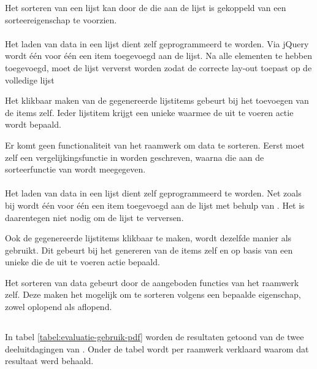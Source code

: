 Het sorteren van een lijst kan door de  die aan de lijst is gekoppeld van een sorteereigenschap te voorzien.

\paragraph{\jqm}
Het laden van data in een lijst dient zelf geprogrammeerd te worden.
Via jQuery wordt één voor één een item toegevoegd aan de lijst.
Na alle elementen te hebben toegevoegd, moet de lijst ververst worden zodat \jqm{} de correcte lay-out toepast op de volledige lijst

Het klikbaar maken van de gegenereerde lijstitems gebeurt bij het toevoegen van de items zelf.
Ieder lijstitem krijgt een unieke  waarmee de uit te voeren actie wordt bepaald.

Er komt geen functionaliteit van het raamwerk om data te sorteren.
Eerst moet zelf een vergelijkingsfunctie in \js{} worden geschreven, waarna die aan de sorteerfunctie van \js{} wordt meegegeven.

\paragraph{\lungo}
Het laden van data in een lijst dient zelf geprogrammeerd te worden.
Net zoals bij \jqm{} wordt één voor één een item toegevoegd aan de lijst met behulp van \quo{}.
Het is daarentegen niet nodig om de lijst te verversen.

Ook de gegenereerde lijstitems klikbaar te maken, wordt dezelfde manier  als \jqm{} gebruikt.
Dit gebeurt bij het genereren van de items zelf en op basis van een unieke  die de uit te voeren actie bepaald.

Het sorteren van data gebeurt door de aangeboden functies van het raamwerk zelf.
Deze maken het mogelijk om te sorteren volgens een bepaalde eigenschap, zowel oplopend als aflopend.



\subsection{}
\label{sec:evaluatie-gebruik-pdf}

In tabel \ref{tabel:evaluatie-gebruik-pdf} worden de resultaten getoond van de twee deeluitdagingen van .
Onder de tabel wordt per raamwerk verklaard waarom dat resultaat werd behaald.

